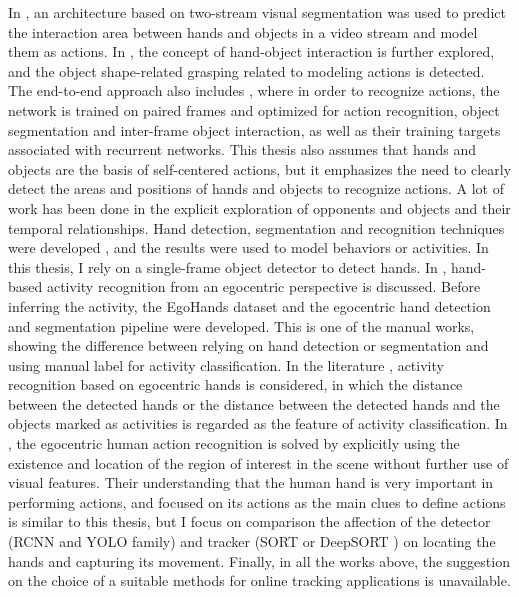 In \cite{DBLP:journals/corr/BertasiusPYS16}, an architecture based on two-stream visual segmentation was used to predict the interaction area between hands and objects in a video stream and model them as actions. In \cite{cai2016understanding}, the concept of hand-object interaction is further explored, and the object shape-related grasping related to modeling actions is detected. The end-to-end approach also includes \cite{DBLP:journals/corr/abs-1806-06157}, where in order to recognize actions, the network is trained on paired frames and optimized for action recognition, object segmentation and inter-frame object interaction, as well as their training targets associated with recurrent networks. This thesis also assumes that hands and objects are the basis of self-centered actions, but it emphasizes the need to clearly detect the areas and positions of hands and objects to recognize actions.
A lot of work has been done in the explicit exploration of opponents and objects and their temporal relationships. Hand detection, segmentation and recognition techniques were developed \cite{6619302} \cite{6910041} \cite{10.1016/j.cviu.2016.09.005}, and the results were used to model behaviors or activities. In this thesis, I rely on a single-frame object detector to detect hands. In \cite{7410583}, hand-based activity recognition from an egocentric perspective is discussed. Before inferring the activity, the EgoHands dataset and the egocentric hand detection and segmentation pipeline were developed. This is one of the manual works, showing the difference between relying on hand detection or segmentation and using manual label for activity classification. In the literature \cite{Recognition}, activity recognition based on egocentric hands is considered, in which the distance between the detected hands or the distance between the detected hands and the objects marked as activities is regarded as the feature of activity classification.
In \cite{9060114}, the egocentric human action recognition is solved by explicitly using the existence and location of the region of interest in the scene without further use of visual features. Their understanding that the human hand is very important in performing actions, and focused on its actions as the main clues to define actions is similar to this thesis, but I focus on comparison the affection of the detector (RCNN and YOLO family) and tracker (SORT \cite{DBLP:journals/corr/BewleyGORU16} or DeepSORT \cite{DBLP:journals/corr/WojkeBP17} ) on locating the hands and capturing its movement. Finally, in all the works above, the suggestion on the choice of a suitable methods for online tracking applications is unavailable.
